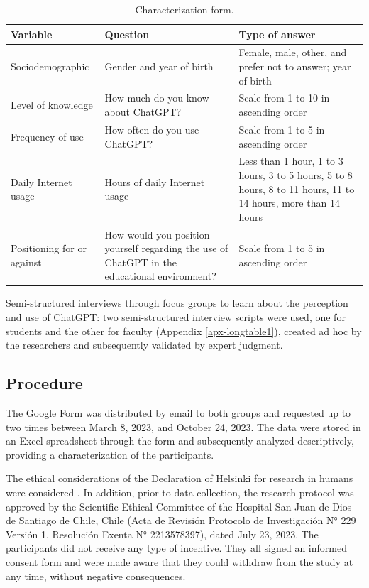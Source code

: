 \documentclass[english]{textolivre}
\begin{document}
\begin{table}[h!]
\centering
\begin{threeparttable}
\caption{Characterization form.}
\label{tab1}
\begin{tabular}{p{3cm}p{5cm}p{5.5cm}}
\toprule
Variable & Question & Type of answer \\
\midrule

Sociodemographic &
Gender and year of birth &
Female, male, other, and prefer not to answer; year of birth \\

Level of knowledge &
How much do you know about ChatGPT? &
Scale from 1 to 10 in ascending order \\

Frequency of use &
How often do you use ChatGPT? &
Scale from 1 to 5 in ascending order \\

Daily Internet usage &
Hours of daily Internet usage &
Less than 1 hour, 1 to 3 hours, 3 to 5 hours, 5 to 8 hours, 8 to 11 hours, 11 to 14 hours, more than 14 hours \\

Positioning for or against &
How would you position yourself regarding the use of ChatGPT in the educational environment? &
Scale from 1 to 5 in ascending order \\
\bottomrule
\end{tabular}
\end{threeparttable}
\end{table}

Semi-structured interviews through focus groups to learn about the perception and use of ChatGPT: two semi-structured interview scripts were used, one for students and the other for faculty (Appendix \ref{apx-longtable1}), created ad hoc by the researchers and subsequently validated by expert judgment.


\subsection{Procedure}\label{sec-formato}
The Google Form was distributed by email to both groups and requested up to two times between March 8, 2023, and October 24, 2023. The data were stored in an Excel spreadsheet through the form and subsequently analyzed descriptively, providing a characterization of the participants.

The ethical considerations of the Declaration of Helsinki for research in humans were considered \cite{wma2013helsinki}. In addition, prior to data collection, the research protocol was approved by the Scientific Ethical Committee of the Hospital San Juan de Dios de Santiago de Chile, Chile (Acta de Revisión Protocolo de Investigación N° 229 Versión 1, Resolución Exenta N° 2213578397), dated July 23, 2023. The participants did not receive any type of incentive. They all signed an informed consent form and were made aware that they could withdraw from the study at any time, without negative consequences.
\end{document}
